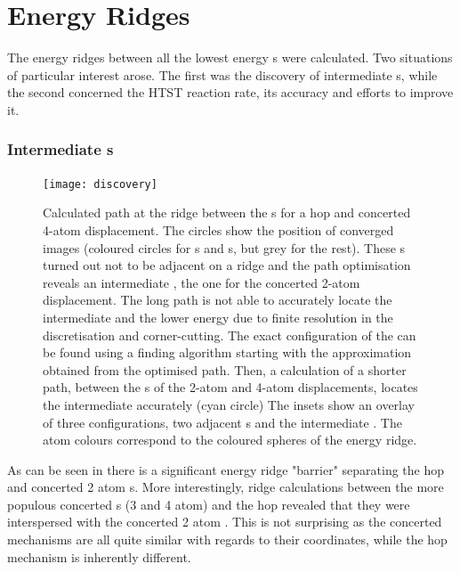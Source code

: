 \section{Energy Ridges}
\label{al-energy-ridges}

The energy ridges between all the lowest energy s were calculated.
Two situations of particular interest arose.
The first was the discovery of intermediate s, while the second concerned the HTST reaction rate, its accuracy and efforts to improve it.

\subsubsection{Intermediate s}
\begin{figure}[hp]
\begin{center}
\texttt{[image: discovery]}
\caption{
Calculated path at the ridge between the s for a hop and concerted 4-atom displacement.
The circles show the position of converged images (coloured circles for s and s, but grey for the rest). 
These s turned out not to be adjacent on a ridge and the path optimisation reveals an intermediate , the one for the concerted 2-atom displacement.
The long path is not able to accurately locate the intermediate  and the lower energy  due to finite resolution in the discretisation and corner-cutting.
The exact configuration of the  can be found using a  finding algorithm starting with the approximation obtained from the optimised path.
Then, a calculation of a shorter path, between the s of the 2-atom  and 4-atom displacements, locates the intermediate  accurately (cyan circle)
The insets show an overlay of three configurations, two adjacent s and the intermediate .
The atom colours correspond to the coloured spheres of the energy ridge.
}
\label{fig:discovery}
\end{center}
\end{figure}

As can be seen in  there is a significant energy ridge "barrier" separating the hop and concerted 2 atom s.
More interestingly, ridge calculations between the more populous concerted s (3 and 4 atom) and the hop revealed that they were interspersed with the concerted 2 atom .
This is not surprising as the concerted mechanisms are all quite similar with regards to their coordinates, while the hop mechanism is inherently different.

